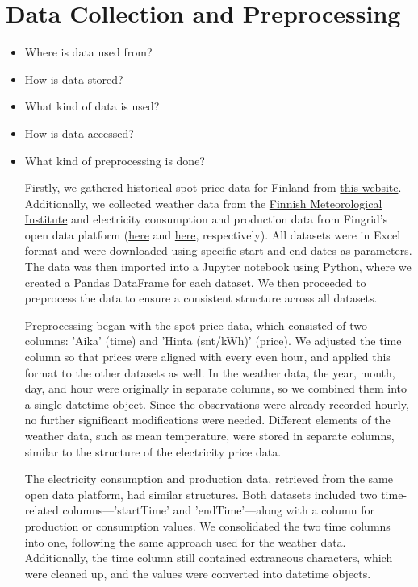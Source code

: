 \documentclass{article}
\numberwithin{equation}{section}
\begin{document}
\section{Data Collection and Preprocessing}
\begin{itemize}
	\item Where is data used from?
	\item How is data stored?
	\item What kind of data is used?
	\item How is data accessed?
	\item What kind of preprocessing is done?

Firstly, we gathered historical spot price data for Finland from \href{https://porssisahko.net/tilastot}{this website}. Additionally, we collected weather data from the \href{https://www.ilmatieteenlaitos.fi/avoin-data/}{Finnish Meteorological Institute} and electricity consumption and production data from Fingrid's open data platform (\href{https://data.fingrid.fi/en/datasets/124}{here} and \href{https://data.fingrid.fi/en/datasets/192}{here}, respectively). All datasets were in Excel format and were downloaded using specific start and end dates as parameters. The data was then imported into a Jupyter notebook using Python, where we created a Pandas DataFrame for each dataset. We then proceeded to preprocess the data to ensure a consistent structure across all datasets.

Preprocessing began with the spot price data, which consisted of two columns: 'Aika' (time) and 'Hinta (snt/kWh)' (price). We adjusted the time column so that prices were aligned with every even hour, and applied this format to the other datasets as well. In the weather data, the year, month, day, and hour were originally in separate columns, so we combined them into a single datetime object. Since the observations were already recorded hourly, no further significant modifications were needed. Different elements of the weather data, such as mean temperature, were stored in separate columns, similar to the structure of the electricity price data.

The electricity consumption and production data, retrieved from the same open data platform, had similar structures. Both datasets included two time-related columns—'startTime' and 'endTime'—along with a column for production or consumption values. We consolidated the two time columns into one, following the same approach used for the weather data. Additionally, the time column still contained extraneous characters, which were cleaned up, and the values were converted into datetime objects.


\end{itemize}
\end{document}
